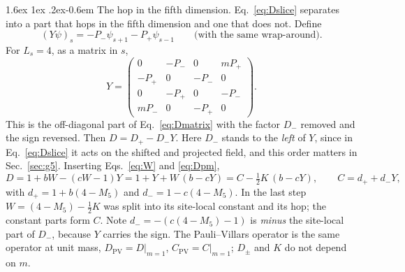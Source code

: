 \documentclass[11pt,a4paper]{article}
\makeatletter
\renewcommand\paragraph{\@startsection{paragraph}{4}{\z@}%
  {1.6ex \@plus 1ex \@minus .2ex}{-0.6em}%
  {\normalfont\normalsize\itshape}}
\numberwithin{equation}{section}
\newcommand{\Dpv}{D_{\mathrm{PV}}}
\newcommand{\Cpv}{C_{\mathrm{PV}}}
\newcommand{\Pp}{P_{+}}
\newcommand{\Pm}{P_{-}}
\makeatother
\begin{document}
\paragraph{The hop in the fifth dimension.} Eq.~\eqref{eq:Dslice} separates into a part
that hops in the fifth dimension and one that does not. Define
\begin{equation}
(Y\psi)_s=-\Pm\psi_{s+1}-\Pp\psi_{s-1}\qquad\text{(with the same wrap-around)}.
\label{eq:Y}
\end{equation}
For $L_s=4$, as a matrix in $s$,
\begin{equation}
Y=\begin{pmatrix}
0 & -\Pm & 0 & m\Pp\\
-\Pp & 0 & -\Pm & 0\\
0 & -\Pp & 0 & -\Pm\\
m\Pm & 0 & -\Pp & 0
\end{pmatrix}.
\label{eq:Ymatrix}
\end{equation}
This is the off-diagonal part of Eq.~\eqref{eq:Dmatrix} with the factor $D_-$ removed and
the sign reversed. Then
$D=D_+-D_-Y$. Here $D_-$ stands to the \emph{left} of $Y$, since in Eq.~\eqref{eq:Dslice} it
acts on the shifted and projected field, and this order matters in Sec.~\ref{sec:g5}. Inserting
Eqs.~\eqref{eq:W} and \eqref{eq:Dpm},
\begin{equation}
D=1+bW-(cW-1)Y=1+Y+W\,(b-cY)=C-\tfrac12K\,(b-cY),\qquad C=d_++d_-Y,
\label{eq:D}
\end{equation}
with $d_+=1+b(4-M_5)$ and $d_-=1-c(4-M_5)$. In the last step $W=(4-M_5)-\frac12K$ was split
into its site-local constant and its hop; the constant parts form $C$. Note
$d_-=-(c(4-M_5)-1)$ is \emph{minus} the site-local part of $D_-$, because $Y$ carries the
sign. The Pauli--Villars operator is the same operator at unit mass, $\Dpv=D|_{m=1}$,
$\Cpv=C|_{m=1}$; $D_\pm$ and $K$ do not depend on $m$.
\end{document}
